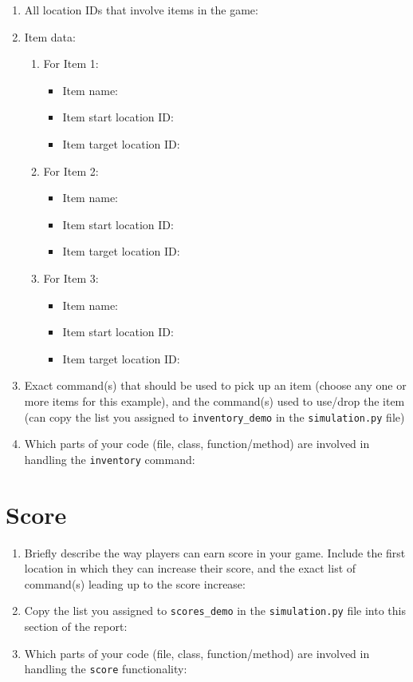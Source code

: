 \documentclass[11pt]{article}
\begin{document}
\begin{enumerate}
\item All location IDs that involve items in the game:

\item Item data:
\begin{enumerate}
    \item For Item 1:
    \begin{itemize}
    \item Item name:
    \item Item start location ID:
    \item Item target location ID:
    \end{itemize}
        \item For Item 2:
    \begin{itemize}
    \item Item name:
    \item Item start location ID:
    \item Item target location ID:
    \end{itemize}
        \item For Item 3:
    \begin{itemize}
    \item Item name:
    \item Item start location ID:
    \item Item target location ID:
    \end{itemize}
\end{enumerate}

    \item Exact command(s) that should be used to pick up an item (choose any one or more items for this example), and the command(s) used to use/drop the item (can copy the list you assigned to \texttt{inventory\_demo} in the \texttt{simulation.py} file)
    \item Which parts of your code (file, class, function/method) are involved in handling the \texttt{inventory} command:
\end{enumerate}

\section*{Score}
\begin{enumerate}

    \item Briefly describe the way players can earn score in your game. Include the first location in which they can increase their score, and the exact list of command(s) leading up to the score increase:


    \item Copy the list you assigned to \texttt{scores\_demo} in the \texttt{simulation.py} file into this section of the report:


    \item Which parts of your code (file, class, function/method) are involved in handling the \texttt{score} functionality:
\end{enumerate}
\end{document}
